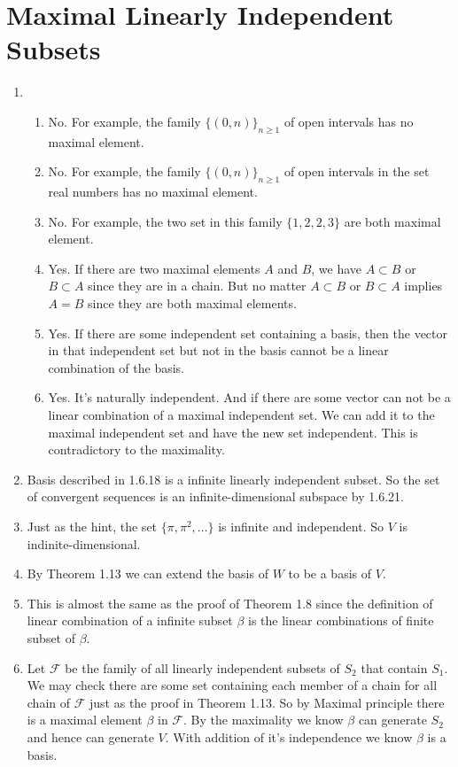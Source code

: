 \section{Maximal Linearly Independent Subsets}
\begin{enumerate}
\item \begin{enumerate}
\item No. For example, the family $\{(0,n)\}_{n\geq 1}$ of open intervals has no maximal element.
\item No. For example, the family $\{(0,n)\}_{n\geq 1}$ of open intervals in the set real numbers has no maximal element.
\item No. For example, the two set in this family $\{{1,2},{2,3}\}$ are both maximal element.
\item Yes. If there are two maximal elements $A$ and $B$, we have $A\subset B$ or $B\subset A$ since they are in a chain. But no matter $A\subset B$ or $B\subset A$ implies $A=B$ since they are both maximal elements.
\item Yes. If there are some independent set containing a basis, then the vector in that independent set but not in the basis cannot be a linear combination of the basis.
\item Yes. It's naturally independent. And if there are some vector can not be a linear combination of a maximal independent set. We can add it to the maximal independent set and have the new set independent. This is contradictory to the maximality.
\end{enumerate}
\item Basis described in 1.6.18 is a infinite linearly independent subset. So the set of convergent sequences is an infinite-dimensional subspace by 1.6.21.
\item Just as the hint, the set $\{\pi, \pi^2, \ldots \}$ is infinite and independent. So $V$ is indinite-dimensional.
\item By Theorem 1.13 we can extend the basis of $W$ to be a basis of $V$.
\item This is almost the same as the proof of Theorem 1.8 since the definition of linear combination of a infinite subset $\beta $ is the linear combinations of finite subset of $\beta $.
\item Let $\mathscr{F}$ be the family of all linearly independent subsets of $S_2$ that contain $S_1$. We may check there are some set containing each member of a chain for all chain of $\mathscr{F}$ just as the proof in Theorem 1.13. So by Maximal principle there is a maximal element $\beta $ in $\mathscr{F}$. By the maximality we know $\beta $ can generate $S_2$ and hence can generate $V$. With addition of it's independence we know $\beta $ is a basis.

\end{enumerate}
